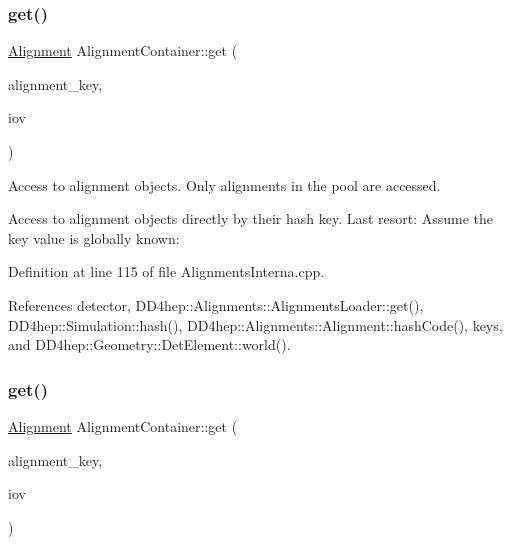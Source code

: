 \subsubsection{\texorpdfstring{get()}{get()}\hspace{0.1cm}{\footnotesize\ttfamily [3/4]}}
{\footnotesize\ttfamily \hyperlink{class_d_d4hep_1_1_alignments_1_1_alignment}{Alignment} Alignment\+Container\+::get (\begin{DoxyParamCaption}\item[{const std\+::string \&}]{alignment\+\_\+key,  }\item[{const \hyperlink{class_d_d4hep_1_1_conditions_1_1_user_pool}{User\+Pool} \&}]{iov }\end{DoxyParamCaption})}



Access to alignment objects. Only alignments in the pool are accessed. 

Access to alignment objects directly by their hash key. Last resort\+: Assume the key value is globally known\+: 

Definition at line 115 of file Alignments\+Interna.\+cpp.



References detector, D\+D4hep\+::\+Alignments\+::\+Alignments\+Loader\+::get(), D\+D4hep\+::\+Simulation\+::hash(), D\+D4hep\+::\+Alignments\+::\+Alignment\+::hash\+Code(), keys, and D\+D4hep\+::\+Geometry\+::\+Det\+Element\+::world().

\hypertarget{class_d_d4hep_1_1_alignments_1_1_interna_1_1_alignment_container_ae9d28749c0b244cac8d9206fca1c06fe}{}\label{class_d_d4hep_1_1_alignments_1_1_interna_1_1_alignment_container_ae9d28749c0b244cac8d9206fca1c06fe} 
\subsubsection{\texorpdfstring{get()}{get()}\hspace{0.1cm}{\footnotesize\ttfamily [4/4]}}
{\footnotesize\ttfamily \hyperlink{class_d_d4hep_1_1_alignments_1_1_alignment}{Alignment} Alignment\+Container\+::get (\begin{DoxyParamCaption}\item[{\hyperlink{class_d_d4hep_1_1_alignments_1_1_interna_1_1_alignment_container_a7395f0e25d9e524d2a2bd7df0f4364e6}{key\+\_\+type}}]{alignment\+\_\+key,  }\item[{const \hyperlink{class_d_d4hep_1_1_conditions_1_1_user_pool}{User\+Pool} \&}]{iov }\end{DoxyParamCaption})}




